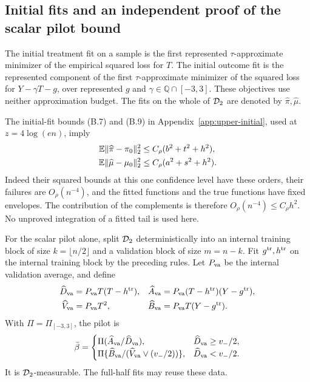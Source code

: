 \subsection{Initial fits and an independent proof of the scalar pilot bound}
\label{app:approximation-pilot}

The initial treatment fit on a sample is the first represented
$\tau$-approximate minimizer of the empirical squared loss for $T$.
The initial outcome fit is the represented component of the first
$\tau$-approximate minimizer of the squared loss for $Y-\gamma T-g$,
over represented $g$ and $\gamma\in\mathbb Q\cap[-3,3]$.
These objectives use neither approximation budget. The fits on the
whole of $\mathcal D_2$ are denoted by $\widehat\pi,\widehat\mu$.

The initial-fit bounds (B.7) and (B.9) in
Appendix~\ref{app:upper-initial}, used at $z=4\log(en)$, imply
\begin{equation}
 \begin{split}
 \mathbb E\|\widehat\pi-\pi_0\|_2^2
 &\le C_\rho(b^2+t^2+h^2),\\
 \mathbb E\|\widehat\mu-\mu_0\|_2^2
 &\le C_\rho(a^2+s^2+h^2).
 \end{split}
 \label{eq:approximation-fit-moments}
\end{equation}
Indeed their squared bounds at this one confidence level have these
orders, their failures are $O_\rho(n^{-4})$, and the fitted functions
and the true functions have fixed envelopes. The contribution of the
complements is therefore $O_\rho(n^{-4})\le C_\rho h^2$. No
unproved integration of a fitted tail is used here.

For the scalar pilot alone, split $\mathcal D_2$ deterministically into an
internal training block of size $k=\lfloor n/2\rfloor$ and a validation
block of size $m=n-k$. Fit $g^{\rm tr},h^{\rm tr}$ on the internal
training block by the preceding rules. Let $P_{\rm va}$ be the
internal validation average, and define
\begin{align*}
 \widehat D_{\rm va}&=P_{\rm va}T(T-h^{\rm tr}),&
 \widehat A_{\rm va}&=P_{\rm va}(T-h^{\rm tr})(Y-g^{\rm tr}),\\
 \widehat V_{\rm va}&=P_{\rm va}T^2,&
 \widehat B_{\rm va}&=P_{\rm va}T(Y-g^{\rm tr}).
\end{align*}
With $\Pi=\Pi_{[-3,3]}$, the pilot is
\begin{equation}
 \bar\beta=
 \begin{cases}
  \Pi(\widehat A_{\rm va}/\widehat D_{\rm va}),
       &\widehat D_{\rm va}\ge v_-/2,\\
  \Pi\{\widehat B_{\rm va}/(\widehat V_{\rm va}\vee(v_-/2))\},
       &\widehat D_{\rm va}<v_-/2.
 \end{cases}
 \label{eq:approximation-pilot-rule}
\end{equation}
It is $\mathcal D_2$-measurable. The full-half fits may reuse these data.

